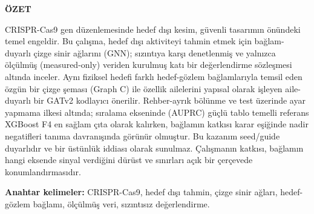 \documentclass[final]{article}
\begin{document}
\colorbox{SoftSlate}{%
\begin{minipage}{\dimexpr\linewidth-0.7cm\relax}
  \vspace{0.30cm}\hspace{0.3cm}%
  \begin{minipage}{\dimexpr\linewidth-0.6cm\relax}
    {\fontsize{21}{25}\selectfont\bfseries\color{Blue}ÖZET\par}
    \vspace{0.16cm}
    {\fontsize{18}{24}\selectfont\color{Ink}\justifying
    CRISPR-Cas9 gen düzenlemesinde hedef dışı kesim, güvenli tasarımın önündeki temel engeldir. Bu çalışma, hedef dışı aktiviteyi tahmin etmek için bağlam-duyarlı çizge sinir ağlarını (GNN); sızıntıya karşı denetlenmiş ve yalnızca ölçülmüş (measured-only) veriden kurulmuş katı bir değerlendirme sözleşmesi altında inceler. Aynı fiziksel hedefi farklı hedef-gözlem bağlamlarıyla temsil eden özgün bir çizge şeması (Graph C) ile özellik ailelerini yapısal olarak işleyen aile-duyarlı bir GATv2 kodlayıcı önerilir. Rehber-ayrık bölünme ve test üzerinde ayar yapmama ilkesi altında; sıralama ekseninde (AUPRC) güçlü tablo temelli referans XGBoost F4 en sağlam çıta olarak kalırken, bağlamın katkısı karar eşiğinde nadir negatifleri tanıma davranışında görünür olmuştur. Bu kazanım seed/guide duyarlıdır ve bir üstünlük iddiası olarak sunulmaz. Çalışmanın katkısı, bağlamın hangi eksende sinyal verdiğini dürüst ve sınırları açık bir çerçevede konumlandırmasıdır.\par}
    \vspace{0.18cm}
    {\fontsize{16}{20}\selectfont\color{Muted}\textbf{Anahtar kelimeler:} CRISPR-Cas9, hedef dışı tahmin, çizge sinir ağları, hedef-gözlem bağlamı, ölçülmüş veri, sızıntısız değerlendirme.\par}
  \end{minipage}
  \vspace{0.32cm}
\end{minipage}}

\vspace{0.6cm}
\end{document}
